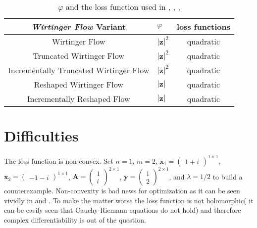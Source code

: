 \begin{table}
	\centering
	\begin{tabular}{||c l c||} 
	 \hline
	 \emph{Wirtinger Flow} Variant 			& $\varphi$ 						& loss functions\\ [0.5ex] 
	 \hline\hline
	 Wirtinger Flow 			 			& $\left|\boldsymbol{z}\right|^2$ 	& quadratic 	\\ 
	 Truncated Wirtinger Flow   			& $\left|\boldsymbol{z}\right|^2$ 	& quadratic 	\\
	 Incrementally Truncated Wirtinger Flow & $\left|\boldsymbol{z}\right|^2$  	& quadratic 	\\
	 Reshaped Wirtinger Flow 				& $\left|\boldsymbol{z}\right|$ 	& quadratic 	\\
	 Incrementally Reshaped Flow 			& $\left|\boldsymbol{z}\right|$ 	& quadratic 	\\ [1ex] 
	 \hline
	\end{tabular}
	\caption{$\varphi$ and the loss function used in \cite{wirtinger_flow_cadnes}, \cite{truncated_wirtinger_flow}, \cite{incrementaly_truncated_wirtinger_flow}, \cite{reshaped_and_incrementally_reshaped_wirtinger_flow}}
	\label{tab:formulation}
	\end{table}
\section{Difficulties}

The loss function is non-convex. Set $n=1$, $m=2$, $\boldsymbol{x}_1 = \begin{pmatrix}1+i\end{pmatrix}^{1 \times 1}$, 
$\boldsymbol{x}_2 = \begin{pmatrix}-1-i\end{pmatrix}^{1 \times 1}$, $\boldsymbol{A}=\begin{pmatrix}1\\i \end{pmatrix}^{2 \times 1}$, 
$\boldsymbol{y}=\begin{pmatrix}1\\2 \end{pmatrix}^{2 \times 1}$, and $\lambda=1/2$ to build a counterexample. Non-convexity is bad news for 
optimization as it can be seen vividly in \cite{Boyd2004} and \cite{Nocedal2006}. To make the matter worse the loss function is not 
holomorphic( it can be easily seen that Cauchy-Riemann equations\cite{Rudin1987} do not hold) and therefore complex differentiability 
is out of the question\cite{Rudin1987}.

